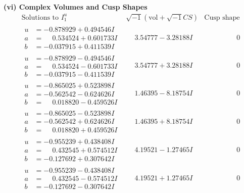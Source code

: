 \documentclass[1p]{elsarticle_modified}
\theoremstyle{definition}
\newcommand{\I}{\sqrt{-1}}
\begin{document}
\newpage\flushleft \textbf{(vi) Complex Volumes and Cusp Shapes}
$$\begin{array}{c|c|c}  
\text{Solutions to }I^u_{1}& \I (\text{vol} + \sqrt{-1}CS) & \text{Cusp shape}\\
 \hline 
\begin{aligned}
u &= -0.878929 + 0.494546 I \\
a &= \phantom{-}0.534524 + 0.601733 I \\
b &= -0.037915 + 0.411539 I\end{aligned}
 & \phantom{-}3.54777 - 3.28188 I & \phantom{-0.000000 } 0 \\ \hline\begin{aligned}
u &= -0.878929 - 0.494546 I \\
a &= \phantom{-}0.534524 - 0.601733 I \\
b &= -0.037915 - 0.411539 I\end{aligned}
 & \phantom{-}3.54777 + 3.28188 I & \phantom{-0.000000 } 0 \\ \hline\begin{aligned}
u &= -0.865025 + 0.523898 I \\
a &= -0.562542 - 0.624626 I \\
b &= \phantom{-}0.018820 - 0.459526 I\end{aligned}
 & \phantom{-}1.46395 - 8.18754 I & \phantom{-0.000000 } 0 \\ \hline\begin{aligned}
u &= -0.865025 - 0.523898 I \\
a &= -0.562542 + 0.624626 I \\
b &= \phantom{-}0.018820 + 0.459526 I\end{aligned}
 & \phantom{-}1.46395 + 8.18754 I & \phantom{-0.000000 } 0 \\ \hline\begin{aligned}
u &= -0.955239 + 0.438408 I \\
a &= \phantom{-}0.432545 + 0.574512 I \\
b &= -0.127692 + 0.307642 I\end{aligned}
 & \phantom{-}4.19521 - 1.27465 I & \phantom{-0.000000 } 0 \\ \hline\begin{aligned}
u &= -0.955239 - 0.438408 I \\
a &= \phantom{-}0.432545 - 0.574512 I \\
b &= -0.127692 - 0.307642 I\end{aligned}
 & \phantom{-}4.19521 + 1.27465 I & \phantom{-0.000000 } 0 \\ \hline\begin{aligned}

\end{aligned}
\end{array}$$
\end{document}
